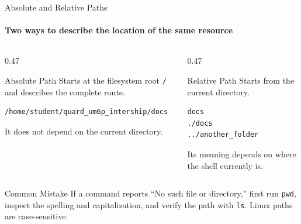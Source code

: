 \begin{frame}[fragile]{Absolute and Relative Paths}
\framesubtitle{Two ways to describe the location of the same resource}

\footnotesize

\begin{columns}[T,onlytextwidth]
    \begin{column}{0.47\textwidth}
        \begin{block}{Absolute Path}
            Starts at the filesystem root \texttt{/} and describes the complete route.

\begin{verbatim}
/home/student/quard_um6p_intership/docs
\end{verbatim}

            It does not depend on the current directory.
        \end{block}
    \end{column}

    \begin{column}{0.47\textwidth}
        \begin{exampleblock}{Relative Path}
            Starts from the current directory.

\begin{verbatim}
docs
./docs
../another_folder
\end{verbatim}

            Its meaning depends on where the shell currently is.
        \end{exampleblock}
    \end{column}
\end{columns}

\begin{alertblock}{Common Mistake}
If a command reports ``No such file or directory,'' first run \texttt{pwd},
inspect the spelling and capitalization, and verify the path with \texttt{ls}.
Linux paths are case-sensitive.
\end{alertblock}
\end{frame}

